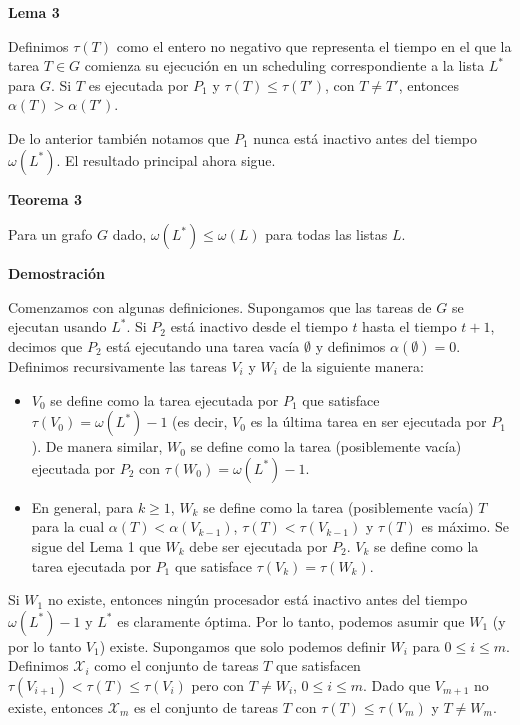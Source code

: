 \documentclass[14pt]{extarticle}
\begin{document}
\textbf{Lema 3}

Definimos $\tau(T)$ como el entero no negativo que representa el tiempo en el que la tarea $T \in G$ comienza su ejecución en un scheduling correspondiente a la lista $L^*$ para $G$. Si $T$ es ejecutada por $P_1$ y $\tau(T) \leq \tau(T')$, con $T \neq T'$, entonces $\alpha(T) > \alpha(T')$.

De lo anterior también notamos que $P_1$ nunca está inactivo antes del tiempo $\omega(L^*)$. El resultado principal ahora sigue.

\textbf{Teorema 3}

Para un grafo $G$ dado, $\omega(L^*) \leq \omega(L)$ para todas las listas $L$.

\textbf{Demostración}

Comenzamos con algunas definiciones. Supongamos que las tareas de $G$ se ejecutan usando $L^*$. Si $P_2$ está inactivo desde el tiempo $t$ hasta el tiempo $t+1$, decimos que $P_2$ está ejecutando una tarea vacía $\emptyset$ y definimos $\alpha(\emptyset) = 0$. Definimos recursivamente las tareas $V_i$ y $W_i$ de la siguiente manera:

\begin{itemize}
    \item $V_0$ se define como la tarea ejecutada por $P_1$ que satisface $\tau(V_0) = \omega(L^*) - 1$ (es decir, $V_0$ es la última tarea en ser ejecutada por $P_1$). De manera similar, $W_0$ se define como la tarea (posiblemente vacía) ejecutada por $P_2$ con $\tau(W_0) = \omega(L^*) - 1$.
    \item En general, para $k \geq 1$, $W_k$ se define como la tarea (posiblemente vacía) $T$ para la cual $\alpha(T) < \alpha(V_{k-1})$, $\tau(T) < \tau(V_{k-1})$ y $\tau(T)$ es máximo. Se sigue del Lema 1 que $W_k$ debe ser ejecutada por $P_2$. $V_k$ se define como la tarea ejecutada por $P_1$ que satisface $\tau(V_k) = \tau(W_k)$.
\end{itemize}

Si $W_1$ no existe, entonces ningún procesador está inactivo antes del tiempo $\omega(L^*) - 1$ y $L^*$ es claramente óptima. Por lo tanto, podemos asumir que $W_1$ (y por lo tanto $V_1$) existe. Supongamos que solo podemos definir $W_i$ para $0 \leq i \leq m$. Definimos $\mathcal{X}_i$ como el conjunto de tareas $T$ que satisfacen $\tau(V_{i+1}) < \tau(T) \leq \tau(V_i)$ pero con $T \neq W_i$, $0 \leq i \leq m$. Dado que $V_{m+1}$ no existe, entonces $\mathcal{X}_m$ es el conjunto de tareas $T$ con $\tau(T) \leq \tau(V_m)$ y $T \neq W_m$.
\end{document}
